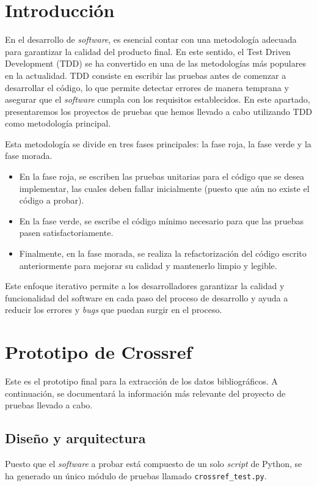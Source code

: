 
\section{Introducción}
En el desarrollo de \textit{software}, es esencial contar con una metodología adecuada para garantizar la calidad del producto final. En este sentido, el Test Driven Development (TDD) se ha convertido en una de las metodologías más populares en la actualidad. TDD consiste en escribir las pruebas antes de comenzar a desarrollar el código, lo que permite detectar errores de manera temprana y asegurar que el \textit{software} cumpla con los requisitos establecidos. En este apartado, presentaremos los proyectos de pruebas que hemos llevado a cabo utilizando TDD como metodología principal.

Esta metodología se divide en tres fases principales: la fase roja, la fase verde y la fase morada. 
\begin{itemize}
    \item En la fase roja, se escriben las pruebas unitarias para el código que se desea implementar, las cuales deben fallar inicialmente (puesto que aún no existe el código a probar). 
    \item En la fase verde, se escribe el código mínimo necesario para que las pruebas pasen satisfactoriamente.
    \item Finalmente, en la fase morada, se realiza la refactorización del código escrito anteriormente para mejorar su calidad y mantenerlo limpio y legible.
\end{itemize}

 Este enfoque iterativo permite a los desarrolladores garantizar la calidad y funcionalidad del software en cada paso del proceso de desarrollo y ayuda a reducir los errores y \textit{bugs} que puedan surgir en el proceso. 


\section{Prototipo de Crossref}
Este es el prototipo final para la extracción de los datos bibliográficos. A continuación, se documentará la información más relevante del proyecto de pruebas llevado a cabo.

\subsection{Diseño y arquitectura}
Puesto que el \textit{software} a probar está compuesto de un solo \textit{script} de Python, se ha generado un único módulo de pruebas llamado \texttt{crossref\_test.py}. 

